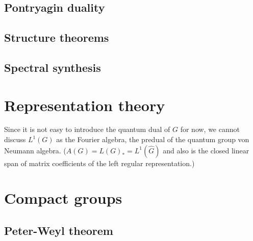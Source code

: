 \documentclass{../../large}
\begin{document}
\section{Pontryagin duality}

\begin{prb}
\end{prb}
\begin{prb}
\end{prb}
\begin{prb}
\end{prb}


\section{Structure theorems}



\section{Spectral synthesis}








\chapter{Representation theory}

\begin{prb}
\end{prb}

\begin{prb}
\end{prb}



Since it is not easy to introduce the quantum dual of $G$ for now, we cannot discuss $L^1(G)$ as the Fourier algebra, the predual of the quantum group von Neumann algebra.
($A(G)=L(G)_*=L^1(\hat G)$ and also is the closed linear span of matrix coefficients of the left regular representation.)



\chapter{Compact groups}
\section{Peter-Weyl theorem}
\end{document}
